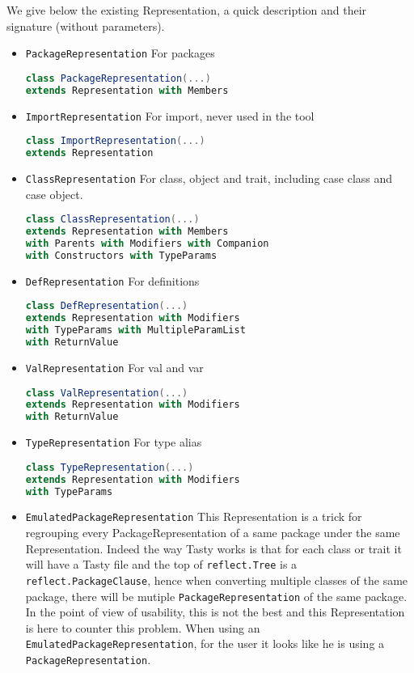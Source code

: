 \documentclass{report}
\begin{document}
We give below the existing Representation, a quick description and their signature (without parameters).
\begin{itemize}
    \item \texttt{PackageRepresentation} For packages
\begin{lstlisting}[language=scala]
class PackageRepresentation(...)
extends Representation with Members
\end{lstlisting}
    \item \texttt{ImportRepresentation} For import, never used in the tool
\begin{lstlisting}[language=scala]
class ImportRepresentation(...)
extends Representation
\end{lstlisting}
    \item \texttt{ClassRepresentation} For class, object and trait, including case class and case object.
\begin{lstlisting}[language=scala]
class ClassRepresentation(...)
extends Representation with Members
with Parents with Modifiers with Companion
with Constructors with TypeParams
\end{lstlisting}
    \item \texttt{DefRepresentation} For definitions
\begin{lstlisting}[language=scala]
class DefRepresentation(...)
extends Representation with Modifiers
with TypeParams with MultipleParamList
with ReturnValue
\end{lstlisting}
    \item \texttt{ValRepresentation} For val and var
\begin{lstlisting}[language=scala]
class ValRepresentation(...)
extends Representation with Modifiers
with ReturnValue
\end{lstlisting}
    \item \texttt{TypeRepresentation} For type alias
\begin{lstlisting}[language=scala]
class TypeRepresentation(...)
extends Representation with Modifiers
with TypeParams 
\end{lstlisting}
    \item \texttt{EmulatedPackageRepresentation} This Representation is a trick for regrouping every PackageRepresentation of a same package under the same Representation. Indeed the way Tasty works is that for each class or trait it will have a Tasty file and the top of \texttt{reflect.Tree} is a \texttt{reflect.PackageClause}, hence when converting multiple classes of the same package, there will be mutiple \texttt{PackageRepresentation} of the same package. In the point of view of usability, this is not the best and this Representation is here to counter this problem. When using an \texttt{EmulatedPackageRepresentation}, for the user it looks like he is using a \texttt{PackageRepresentation}.
\end{itemize}
\end{document}

